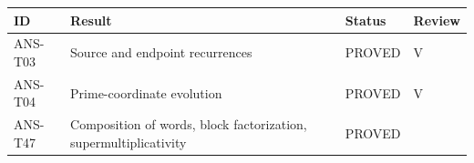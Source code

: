 \documentclass[
  11pt,
]{article}
\begin{document}
\begin{longtable}[]{@{}llll@{}}
\toprule
\begin{minipage}[b]{0.16\columnwidth}\raggedright
ID\strut
\end{minipage} & \begin{minipage}[b]{0.41\columnwidth}\raggedright
Result\strut
\end{minipage} & \begin{minipage}[b]{0.22\columnwidth}\raggedright
Status\strut
\end{minipage} & \begin{minipage}[b]{0.10\columnwidth}\raggedright
Review\strut
\end{minipage}\tabularnewline
\midrule
\endhead
\begin{minipage}[t]{0.16\columnwidth}\raggedright
ANS-T03\strut
\end{minipage} & \begin{minipage}[t]{0.41\columnwidth}\raggedright
Source and endpoint recurrences\strut
\end{minipage} & \begin{minipage}[t]{0.22\columnwidth}\raggedright
PROVED\strut
\end{minipage} & \begin{minipage}[t]{0.10\columnwidth}\raggedright
V\strut
\end{minipage}\tabularnewline
\begin{minipage}[t]{0.16\columnwidth}\raggedright
ANS-T04\strut
\end{minipage} & \begin{minipage}[t]{0.41\columnwidth}\raggedright
Prime-coordinate evolution\strut
\end{minipage} & \begin{minipage}[t]{0.22\columnwidth}\raggedright
PROVED\strut
\end{minipage} & \begin{minipage}[t]{0.10\columnwidth}\raggedright
V\strut
\end{minipage}\tabularnewline
\begin{minipage}[t]{0.16\columnwidth}\raggedright
ANS-T47\strut
\end{minipage} & \begin{minipage}[t]{0.41\columnwidth}\raggedright
Composition of words, block factorization, supermultiplicativity\strut
\end{minipage} & \begin{minipage}[t]{0.22\columnwidth}\raggedright
PROVED\strut
\end{minipage} & \begin{minipage}[t]{0.10\columnwidth}\raggedright

\end{minipage}
\end{longtable}
\end{document}
